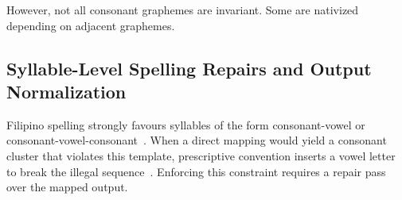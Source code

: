 However, not all consonant graphemes are invariant. Some are nativized
depending on adjacent graphemes.

\subsection{Syllable-Level Spelling Repairs and Output Normalization}

Filipino spelling strongly favours syllables of the form consonant-vowel or
consonant-vowel-consonant~\cite{llamzon1966,magpale2024}. When a direct mapping
would yield a consonant cluster that violates this template, prescriptive
convention inserts a vowel letter to break the illegal
sequence~\cite{almario2014}. Enforcing this constraint requires a repair pass
over the mapped output.

